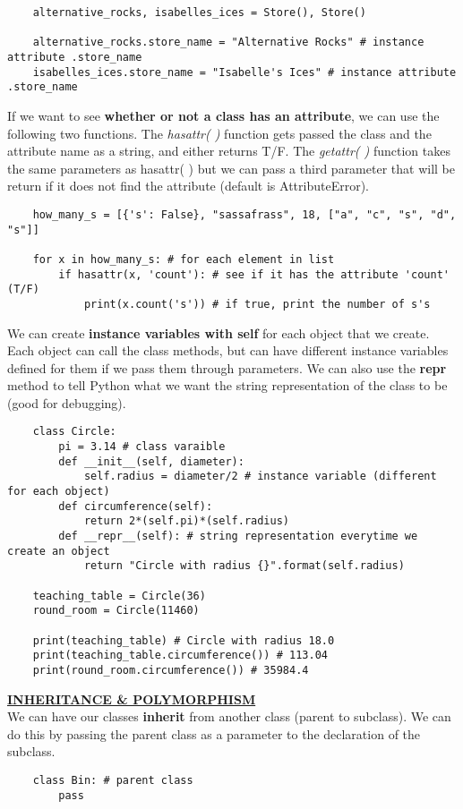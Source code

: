 \documentclass[11pt, a4paper]{article}
\begin{document}
\begin{spacing}{1.1}
\begin{lstlisting}
	alternative_rocks, isabelles_ices = Store(), Store()
	
	alternative_rocks.store_name = "Alternative Rocks" # instance attribute .store_name
	isabelles_ices.store_name = "Isabelle's Ices" # instance attribute .store_name \end{lstlisting} \newpage
	\noindent If we want to see \textbf{whether or not a class has an attribute}, we can use the following two functions. The \textit{hasattr( )} function gets passed the class and the attribute name as a string, and either returns T/F. The \textit{getattr( )} function takes the same parameters as hasattr( ) but we can pass a third parameter that will be return if it does not find the attribute (default is AttributeError).
	\begin{lstlisting}
	how_many_s = [{'s': False}, "sassafrass", 18, ["a", "c", "s", "d", "s"]]
	
	for x in how_many_s: # for each element in list
		if hasattr(x, 'count'): # see if it has the attribute 'count' (T/F)
			print(x.count('s')) # if true, print the number of s's \end{lstlisting}\vspace*{1mm}
	We can create \textbf{instance variables with self} for each object that we create. Each object can call the class methods, but can have different instance variables defined for them if we pass them through parameters. We can also use the \textbf{repr} method to tell Python what we want the string representation of the class to be (good for debugging).
	\begin{lstlisting}
	class Circle:
		pi = 3.14 # class varaible
		def __init__(self, diameter):
			self.radius = diameter/2 # instance variable (different for each object)
		def circumference(self):
			return 2*(self.pi)*(self.radius)
		def __repr__(self): # string representation everytime we create an object
			return "Circle with radius {}".format(self.radius)
	
	teaching_table = Circle(36)
	round_room = Circle(11460)
	
	print(teaching_table) # Circle with radius 18.0
	print(teaching_table.circumference()) # 113.04
	print(round_room.circumference()) # 35984.4 \end{lstlisting}\vspace*{3mm}
	
	\noindent \underline{\textbf{INHERITANCE \& POLYMORPHISM}} \vspace*{1mm} \\
	We can have our classes \textbf{inherit} from another class (parent to subclass). We can do this by passing the parent class as a parameter to the declaration of the subclass. 
	\begin{lstlisting}
	class Bin: # parent class
		pass
	

\end{lstlisting}
\end{spacing}
\end{document}
